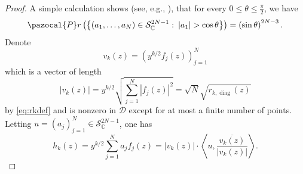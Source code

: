 \documentclass[12pt, a4paper]{amsart}
\newcommand{\tmop}[1]{\ensuremath{\operatorname{#1}}}
\theoremstyle{definition}
\newcommand {\1} {\mathbf{1}}
\newcommand{\prob}{\pazocal{P}r}
\newcommand {\Dc} {\mathcal{D}}
\newcommand{\Scc}{{\mathcal{S}}}
\numberwithin{equation}{section}
\begin{document}
\begin{proof}
A simple calculation shows (see, e.g., \cite[Appendix A]{BurqLebeau}),
that for every $0\le\theta\le\frac{\pi}{2}$, we have
\[
\prob\left(\left\{(a_1,\dots,a_N)\in \Scc_{\mathbb{C}}^{2N-1} :\: \left|a_{1}\right|>\cos\theta\right\}\right)=\left(\sin\theta\right)^{2N-3}.
\]
Denote
\[
v_{k}\left(z\right)=\left(y^{k/2}f_{j}\left(z\right)\right)_{j=1}^{N}
\]
which is a vector of length
\begin{equation} \label{eq:length}
\left|v_{k}\left(z\right)\right|=y^{k/2}\sqrt{\sum_{j=1}^{N}\left|f_{j}\left(z\right)\right|^{2}}=\sqrt{N} \sqrt{r_{k,\tmop{diag}}(z)}
\end{equation}
by \eqref{eq:rkdef} and is nonzero in $\Dc$ except for at most a finite number of points.
Letting $u=\left(a_{j}\right)_{j=1}^{N}\in \Scc_{\mathbb{C}}^{2N-1}$, one has
\[
h_{k}\left(z\right)=y^{k/2}\sum_{j=1}^{N}a_{j}f_{j}\left(z\right)=\left|v_{k}\left(z\right)\right|\cdot\left\langle u,\frac{\overline{v_{k}\left(z\right)}}{\left|v_{k}\left(z\right)\right|}\right\rangle .
\]


\end{proof}
\end{document}

